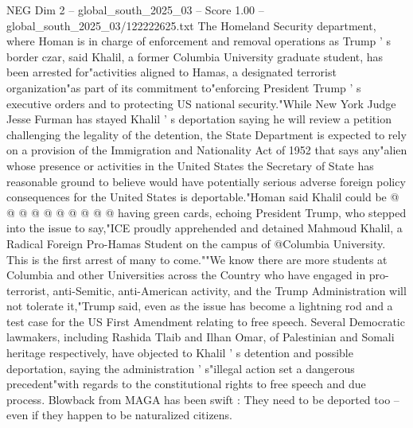 \begin{textsample}{NEG Dim 2 – global\_south\_2025\_03 – Score 1.00 – global\_south\_2025\_03/122222625.txt}
The Homeland Security department, where Homan is in charge of enforcement and removal operations as Trump ' s border czar, said Khalil, a former Columbia University graduate student, has been arrested for"activities aligned to Hamas, a designated terrorist organization"as part of its commitment to"enforcing President Trump ' s executive orders and to protecting US national security."While New York Judge Jesse Furman has stayed Khalil ' s deportation saying he will review a petition challenging the legality of the detention, the State Department is expected to rely on a provision of the Immigration and Nationality Act of 1952 that says any"alien whose presence or activities in the United States the Secretary of State has reasonable ground to believe would have potentially serious adverse foreign policy consequences for the United States is deportable."Homan said Khalil could be @ @ @ @ @ @ @ @ @ @ having green cards, echoing President Trump, who stepped into the issue to say,"ICE proudly apprehended and detained Mahmoud Khalil, a Radical Foreign Pro-Hamas Student on the campus of @Columbia University.
This is the first arrest of many to come.""We know there are more students at Columbia and other Universities across the Country who have engaged in pro-terrorist, anti-Semitic, anti-American activity, and the Trump Administration will not tolerate it,"Trump said, even as the issue has become a lightning rod and a test case for the US First Amendment relating to free speech.
Several Democratic lawmakers, including Rashida Tlaib and Ilhan Omar, of Palestinian and Somali heritage respectively, have objected to Khalil ' s detention and possible deportation, saying the administration ' s"illegal action set a dangerous precedent"with regards to the constitutional rights to free speech and due process.
Blowback from MAGA has been swift : They need to be deported too -- even if they happen to be naturalized citizens.

\end{textsample}
